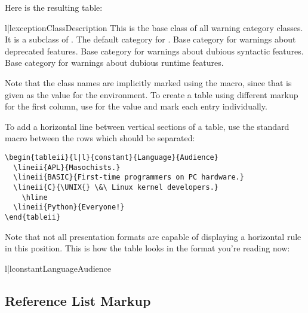 \documentclass{howto}
\begin{document}
    Here is the resulting table:

\begin{tableii}{l|l}{exception}{Class}{Description}
         {This is the base class of all warning category classes.  It
          is a subclass of .}
         {The default category for .}
         {Base category for warnings about deprecated features.}
         {Base category for warnings about dubious syntactic
          features.}
         {Base category for warnings about dubious runtime features.}
\end{tableii}

    Note that the class names are implicitly marked using the
     macro, since that is given as the 
    value for the  environment.  To create a table using
    different markup for the first column, use  for the
     value and mark each entry individually.

    To add a horizontal line between vertical sections of a table, use
    the standard  macro between the rows which should be
    separated:

\begin{verbatim}
\begin{tableii}{l|l}{constant}{Language}{Audience}
  \lineii{APL}{Masochists.}
  \lineii{BASIC}{First-time programmers on PC hardware.}
  \lineii{C}{\UNIX{} \&\ Linux kernel developers.}
    \hline
  \lineii{Python}{Everyone!}
\end{tableii}
\end{verbatim}

    Note that not all presentation formats are capable of displaying a
    horizontal rule in this position.  This is how the table looks in
    the format you're reading now:

\begin{tableii}{l|l}{constant}{Language}{Audience}
    \hline
\end{tableii}


  \subsection{Reference List Markup \label{references}}
\end{document}

